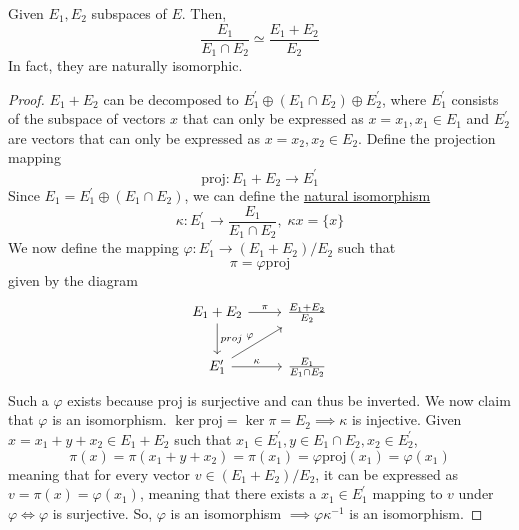   \begin{theorem}
    \label{thm:second-isomorphism-theorem}
    Given $E_1, E_2$ subspaces of $E$. Then, 
    \begin{equation}
      \frac{E_1}{E_1 \cap E_2} \simeq \frac{E_1 + E_2}{E_2}
    \end{equation}
    In fact, they are naturally isomorphic. 
  \end{theorem}
  \begin{proof}
    $E_1 + E_2$ can be decomposed to $E_1^\prime \oplus (E_1 \cap E_2) \oplus E_2^\prime$, where $E_1^\prime$ consists of the subspace of vectors $x$ that can only be expressed as $x = x_1, x_1 \in E_1$ and $E_2^\prime$ are vectors that can only be expressed as $x = x_2, x_2 \in E_2$. Define the projection mapping
    \begin{equation}
      \text{proj}: E_1 + E_2 \to E_1^\prime
    \end{equation}
    Since $E_1 = E_1^\prime \oplus (E_1 \cap E_2)$, we can define the \hyperref[cat-def:natural-isomorphism]{natural isomorphism} 
    \begin{equation}
      \kappa: E_1^\prime \to \frac{E_1}{E_1 \cap E_2}, \; \kappa{x} = \{x\}
    \end{equation}
    We now define the mapping $\varphi: E_1^\prime \to (E_1 + E_2) / E_2$ such that
    \begin{equation}
      \pi = \varphi \text{proj}
    \end{equation}
    given by the diagram 
    \begin{equation}
      \begin{tikzcd}
              E_1 + E_2 \arrow{d}{proj} \arrow{r}{\pi} & \frac{E_1 + E_2}{E_2} \\
              E_1^\prime \arrow{ru}{\varphi} \arrow{r}{\kappa} & \frac{E_1}{E_1 \cap E_2}
          \end{tikzcd}
    \end{equation}
    Such a $\varphi$ exists because proj is surjective and can thus be inverted. We now claim that $\varphi$ is an isomorphism. $\ker{\text{proj}} = \ker{\pi} = E_2 \implies \kappa$ is injective. Given $x = x_1 + y + x_2 \in E_1 + E_2$ such that $x_1 \in E_1^\prime, y \in E_1 \cap E_2, x_2 \in E_2^\prime$, 
    \begin{equation}
      \pi(x) = \pi(x_1 + y + x_2) = \pi(x_1) = \varphi \text{proj} (x_1) = \varphi (x_1)
    \end{equation}
    meaning that for every vector $v \in (E_1 + E_2) / E_2$, it can be expressed as $v = \pi (x) = \varphi (x_1)$, meaning that there exists a $x_1 \in E_1^\prime$ mapping to $v$ under $\varphi \iff \varphi$ is surjective. So, $\varphi$ is an isomorphism $\implies \varphi \kappa^{-1}$ is an isomorphism.  
  \end{proof}

